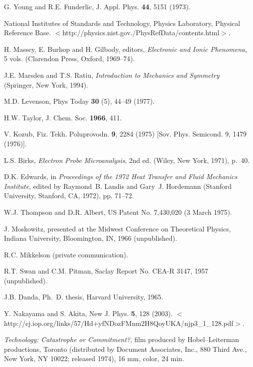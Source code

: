 \documentclass[]{interact}
\theoremstyle{plain}%
\theoremstyle{definition}
\theoremstyle{remark}
\begin{document}
\begin{thebibliography}{99}

G. Young and R.E. Funderlic, J. Appl. Phys. \textbf{44}, 5151 (1973).

National Institutes of Standards and Technology, Physics Laboratory, Physical
  Reference Base. $<$http://physics.nist.gov./PhysRefData/contents.html$>$.

H. Massey, E. Burhop and H. Gilbody, editors, \emph{Electronic and Ionic
  Phenomena}, 5 vols. (Clarendon Press, Oxford, 1969--74).

J.E. Marsden and T.S. Ratiu, \emph{Introduction to Mechanics and Symmetry}
  (Springer, New York, 1994).

M.D. Levenson, Phys Today \textbf{30} (5), 44--49 (1977).

H.W. Taylor, J. Chem. Soc. \textbf{1966}, 411.

V. Kozub, Fiz. Tekh. Poluprovodn. \textbf{9}, 2284 (1975) [Sov. Phys.
  Semicond. 9, 1479 (1976)].

L.S. Birks, \emph{Electron Probe Microanalysis}, 2nd ed. (Wiley, New York,
  1971), p.~40.

D.K. Edwards, in \emph{Proceedings of the 1972 Heat Transfer and Fluid
  Mechanics Institute}, edited by Raymond~B. Landis and Gary~J. Hordemann
  (Stanford University, Stanford, CA, 1972), pp. 71--72.

W.J. Thompson and D.R. Albert, US Patent No. 7,430,020 (3 March 1975).

J. Moskowitz, presented at the Midwest Conference on Theoretical Physics,
  Indiana University, Bloomington, IN, 1966 (unpublished).

R.C. Mikkelson (private communication).

R.T. Swan and C.M. Pitman, Saclay Report No. CEA-R 3147, 1957 (unpublished).

J.B. Danda, Ph.~D. thesis, Harvard University, 1965.

Y. Nakayama and S. Akita, New J. Phys. \textbf{5}, 128 (2003).
  $<$http://ej.iop.org/links/57/Hd+yfNDozFMnm2H8QoyUKA/njp3\_1\_128.pdf$>$.

\emph{Technology: Catastrophe or Commitment?}, film produced by
  Hobel--Leiterman productions, Toronto (distributed by Document Associates,
  Inc., 880 Third Ave., New York, NY 10022; released 1974), 16 mm, color,
  24 min.


\end{thebibliography}
\end{document}
